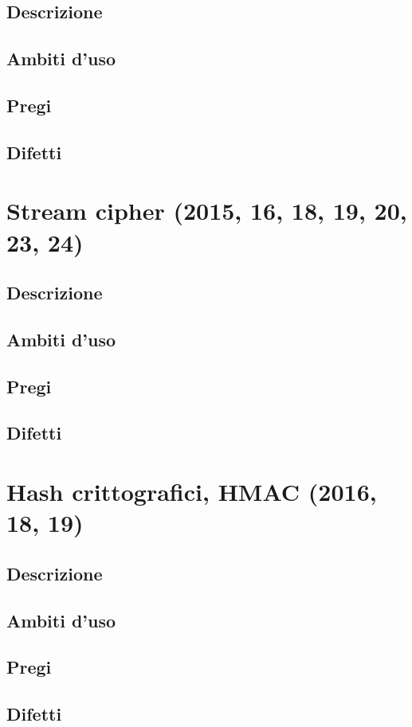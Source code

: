 \documentclass[10pt,oneside,a4paper]{article}
\begin{document}
\subsection{Descrizione}
\subsection{Ambiti d'uso}
\subsection{Pregi}
\subsection{Difetti}
\section{Stream cipher (2015, 16, 18, 19, 20, 23, 24)}
\subsection{Descrizione}
\subsection{Ambiti d'uso}
\subsection{Pregi}
\subsection{Difetti}
\section{Hash crittografici, HMAC (2016, 18, 19)}
\subsection{Descrizione}
\subsection{Ambiti d'uso}
\subsection{Pregi}
\subsection{Difetti}
\end{document}
